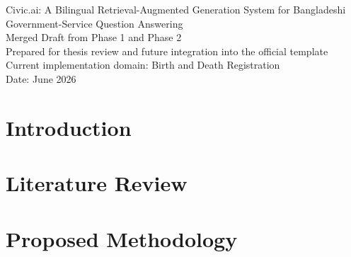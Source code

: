 \documentclass[12pt,oneside,openany]{report}
\begin{document}
\begin{titlepage}
\centering
{\Large Civic.ai: A Bilingual Retrieval-Augmented Generation System for Bangladeshi Government-Service Question Answering\\[1cm]}
{\large Merged Draft from Phase 1 and Phase 2\\[0.5cm]}
{\large Prepared for thesis review and future integration into the official template\\[2cm]}
{\large Current implementation domain: Birth and Death Registration\\[0.5cm]}
{\large Date: June 2026}
\end{titlepage}

{}


\tableofcontents
\listoffigures
\listoftables
\clearpage

\chapter{Introduction}


\chapter{Literature Review}


\chapter{Proposed Methodology}


\printbibliography
\end{document}
